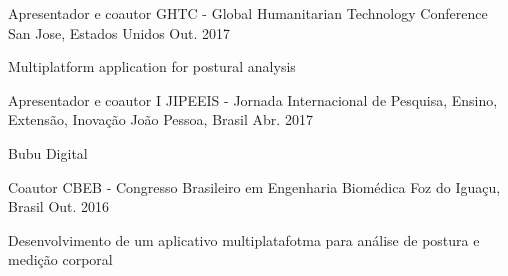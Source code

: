 \begin{cventries}

  \cventry
    {Apresentador e coautor}
    {GHTC - Global Humanitarian Technology Conference}
    {San Jose, Estados Unidos}
    {Out. 2017}
    {
      \begin{cvitems}
        \item {Multiplatform application for postural analysis}
      \end{cvitems}
    }

  \cventry
    {Apresentador e coautor}
    {I JIPEEIS - Jornada Internacional de Pesquisa, Ensino, Extensão, Inovação }
    {João Pessoa, Brasil}
    {Abr. 2017}
    {
      \begin{cvitems}
        \item {Bubu Digital}
      \end{cvitems}
    }

  \cventry
    {Coautor}
    {CBEB - Congresso Brasileiro em Engenharia Biomédica}
    {Foz do Iguaçu, Brasil}
    {Out. 2016}
    {
      \begin{cvitems}
        \item {Desenvolvimento de um aplicativo multiplatafotma para análise de postura e medição corporal}
      \end{cvitems}
    }
%
%


\end{cventries}
